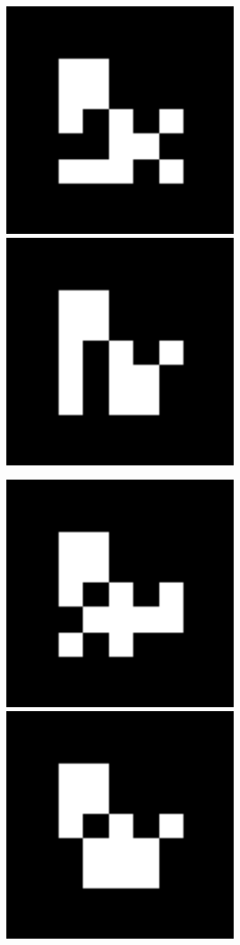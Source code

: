 \documentclass[10pt,letterpaper]{article}
\begin{document}
\includegraphics[width=3in]{MarkerData_145.png}
\includegraphics[width=3in]{MarkerData_146.png}


\includegraphics[width=3in]{MarkerData_147.png}
\includegraphics[width=3in]{MarkerData_148.png}
\end{document}
